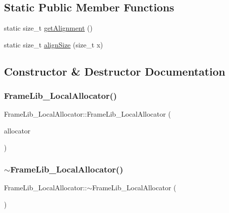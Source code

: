 \subsection*{Static Public Member Functions}
\begin{DoxyCompactItemize}
\item 
static size\+\_\+t \hyperlink{class_frame_lib___local_allocator_a1925095d14b5f3e2b8e8638aea72258d}{get\+Alignment} ()
\item 
static size\+\_\+t \hyperlink{class_frame_lib___local_allocator_aecfc92521d06870cc16712a1a73ae6ee}{align\+Size} (size\+\_\+t x)
\end{DoxyCompactItemize}


\subsection{Constructor \& Destructor Documentation}
\mbox{\label{class_frame_lib___local_allocator_a218131bb74240289b83dc7cd0e0ad6a7}} 
\subsubsection{\texorpdfstring{Frame\+Lib\+\_\+\+Local\+Allocator()}{FrameLib\_LocalAllocator()}}
{\footnotesize\ttfamily Frame\+Lib\+\_\+\+Local\+Allocator\+::\+Frame\+Lib\+\_\+\+Local\+Allocator (\begin{DoxyParamCaption}\item[{\hyperlink{class_frame_lib___global_allocator}{Frame\+Lib\+\_\+\+Global\+Allocator} $\ast$}]{allocator }\end{DoxyParamCaption})}

\mbox{\label{class_frame_lib___local_allocator_a7c7bc361ea0fc016fdc7da6282c963d4}} 
\subsubsection{\texorpdfstring{$\sim$\+Frame\+Lib\+\_\+\+Local\+Allocator()}{~FrameLib\_LocalAllocator()}}
{\footnotesize\ttfamily Frame\+Lib\+\_\+\+Local\+Allocator\+::$\sim$\+Frame\+Lib\+\_\+\+Local\+Allocator (\begin{DoxyParamCaption}{ }\end{DoxyParamCaption})}



